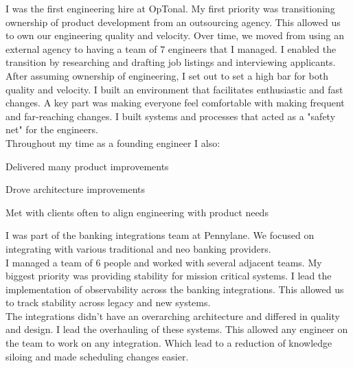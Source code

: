 \documentclass[]{matija-resume}
\begin{document}
\begin{minipage}[t]{1.0\textwidth}
\vspace{\topsep}
I was the first engineering hire at OpTonal. My first priority was transitioning ownership of product development from an outsourcing agency. This allowed us to own our engineering quality and velocity. Over time, we moved from using an external agency to having a team of 7 engineers that I managed. I enabled the transition by researching and drafting job listings and interviewing applicants.\\
\vspace{\topsep}
After assuming ownership of engineering, I set out to set a high bar for both quality and velocity. I built an environment that facilitates enthusiastic and fast changes. A key part was making everyone feel comfortable with making frequent and far-reaching changes. I built systems and processes that acted as a "safety net" for the engineers.\\
\vspace{\topsep}
Throughout my time as a founding engineer I also:\\
\vspace{\topsep}
\begin{tightemize}
\item Delivered many product improvements
\item Drove architecture improvements
\item Met with clients often to align engineering with product needs
\end{tightemize}

\sectionsep

\vspace{\topsep}
I was part of the banking integrations team at Pennylane. We focused on integrating with various traditional and neo banking providers.\\
\vspace{\topsep}
I managed a team of 6 people and worked with several adjacent teams. My biggest priority was providing stability for mission critical systems. I lead the implementation of observability across the banking integrations. This allowed us to track stability across legacy and new systems.\\
\vspace{\topsep}
The integrations didn't have an overarching architecture and differed in quality and design. I lead the overhauling of these systems. This allowed any engineer on the team to work on any integration. Which lead to a reduction of knowledge siloing and made scheduling changes easier.\\
\sectionsep

\end{minipage}
\end{document}
